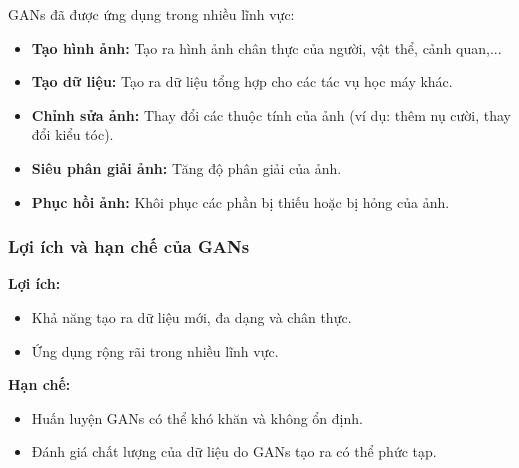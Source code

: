 GANs đã được ứng dụng trong nhiều lĩnh vực:

\begin{itemize}
    \item \textbf{Tạo hình ảnh:} Tạo ra hình ảnh chân thực của người, vật thể, cảnh quan,...
    \item \textbf{Tạo dữ liệu:} Tạo ra dữ liệu tổng hợp cho các tác vụ học máy khác.
    \item \textbf{Chỉnh sửa ảnh:}  Thay đổi các thuộc tính của ảnh (ví dụ: thêm nụ cười, thay đổi kiểu tóc).
    \item \textbf{Siêu phân giải ảnh:} Tăng độ phân giải của ảnh.
    \item \textbf{Phục hồi ảnh:} Khôi phục các phần bị thiếu hoặc bị hỏng của ảnh.
\end{itemize}

\subsubsection{Lợi ích và hạn chế của GANs}

\textbf{Lợi ích:}

\begin{itemize}
    \item Khả năng tạo ra dữ liệu mới, đa dạng và chân thực.
    \item Ứng dụng rộng rãi trong nhiều lĩnh vực.
\end{itemize}

\textbf{Hạn chế:}

\begin{itemize}
    \item Huấn luyện GANs có thể khó khăn và không ổn định.
    \item Đánh giá chất lượng của dữ liệu do GANs tạo ra có thể phức tạp.
\end{itemize}

